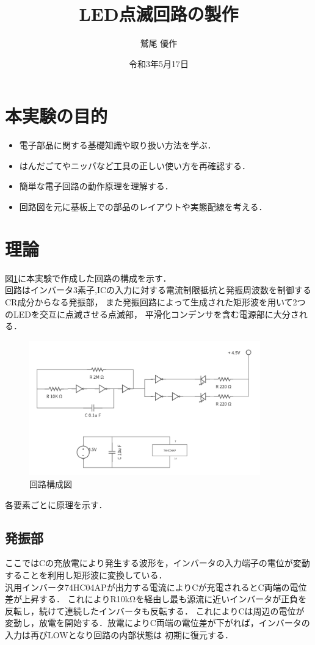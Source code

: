 \documentclass[titlepage]{jarticle}
\title{LED点滅回路の製作}
\author{鷲尾 優作}
\date{令和3年5月17日}
\begin{document}
\maketitle


\section{本実験の目的}
\begin{itemize}
    \item 電子部品に関する基礎知識や取り扱い方法を学ぶ．
    \item はんだごてやニッパなど工具の正しい使い方を再確認する．
    \item 簡単な電子回路の動作原理を理解する．
    \item 回路図を元に基板上での部品のレイアウトや実態配線を考える．
\end{itemize}

\section{理論}
図\ref{fig:回路構成図}に本実験で作成した回路の構成を示す．\\
回路はインバータ3素子,ICの入力に対する電流制限抵抗と発振周波数を制御するCR成分からなる発振部，
また発振回路によって生成された矩形波を用いて2つのLEDを交互に点滅させる点滅部，
平滑化コンデンサを含む電源部に大分される．

\begin{figure}[H]
    \begin{center}
        \includegraphics[width=10cm]{image/circuit.png}
        \caption{回路構成図}
        \label{fig:回路構成図}
    \end{center}
\end{figure}

各要素ごとに原理を示す．\\
\subsection{発振部}
ここではCの充放電により発生する波形を，インバータの入力端子の電位が変動することを利用し矩形波に変換している．\\
汎用インバータ74HC04APが出力する電流によりCが充電されるとC両端の電位差が上昇する．
これによりR10kΩを経由し最も源流に近いインバータが正負を反転し，続けて連続したインバータも反転する．
これによりCは周辺の電位が変動し，放電を開始する．放電によりC両端の電位差が下がれば，インバータの入力は再びLOWとなり回路の内部状態は
初期に復元する．
\end{document}
